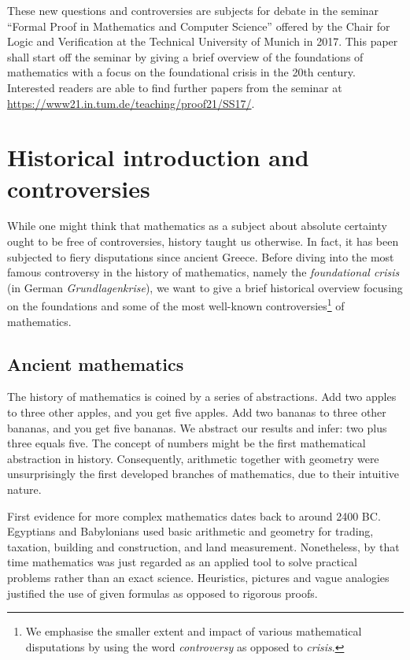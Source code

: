 \documentclass[hidelinks]{article}
\begin{document}
These new questions and controversies are subjects for debate in the seminar ``Formal Proof in Mathematics and Computer Science'' offered by the Chair for Logic and Verification at the Technical University of Munich in 2017. This paper shall start off the seminar by giving a brief overview of the foundations of mathematics with a focus on the foundational crisis in the 20th century. Interested readers are able to find further papers from the seminar at \url{https://www21.in.tum.de/teaching/proof21/SS17/}.
\newpage

\tableofcontents 
\newpage

\section{Historical introduction and controversies}
While one might think that mathematics as a subject about absolute certainty ought to be free of controversies, history taught us otherwise. In fact, it has been subjected to fiery disputations since ancient Greece. Before diving into the most famous controversy in the history of mathematics, namely the \textit{foundational crisis} (in German \textit{Grundlagenkrise}), we want to give a brief historical overview focusing on the foundations and some of the most well-known controversies\footnote{We emphasise the smaller extent and impact of various mathematical disputations by using the word \textit{controversy} as opposed to \textit{crisis}.} of mathematics.

\subsection{Ancient mathematics}

The history of mathematics is coined by a series of abstractions.
Add two apples to three other apples, and you get five apples. Add two bananas to three other bananas, and you get five bananas. We abstract our results and infer: two plus three equals five. The concept of numbers might be the first mathematical abstraction in history. Consequently, arithmetic together with geometry were unsurprisingly the first developed branches of mathematics, due to their intuitive nature.

First evidence for more complex mathematics dates back to around 2400 BC\@. Egyptians and Babylonians used basic arithmetic and geometry for trading, taxation, building and construction, and land measurement. Nonetheless, by that time mathematics was just regarded as an applied tool to solve practical problems rather than an exact science. Heuristics, pictures and vague analogies justified the use of given formulas as opposed to rigorous proofs.
\end{document}
